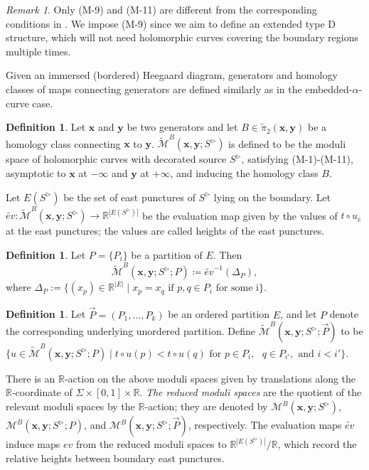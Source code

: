\documentclass{amsart}
\theoremstyle{definition}
\newtheorem{defn}[thm]{Definition}
\theoremstyle{remark}
\newtheorem{rmk}[thm]{Remark}
\numberwithin{equation}{section}
\numberwithin{equation}{section} \makeatletter
\begin{document}
\begin{rmk}
Only (M-9) and (M-11) are different from the corresponding conditions in \cite{LOT18}. We impose (M-9) since we aim to define an extended type D structure, which will not need holomorphic curves covering the boundary regions multiple times.
\end{rmk}

Given an immersed (bordered) Heegaard diagram, generators and homology classes of maps connecting generators are defined similarly as in the embedded-$\alpha$-curve case.
 
\begin{defn}\label{Definition, holomorphic curve in Sigma*[0,1]* R}
Let $\bm{x}$ and $\bm{y}$ be two generators and let $B\in\tilde{\pi}_2(\bm{x},\bm{y})$ be a homology class connecting  $\bm{x}$ to $\bm{y}$. $\widetilde{\mathcal{M}}^B(\bm{x},\bm{y};S^{\triangleright})$ is defined to be the moduli space of holomorphic curves with decorated source $S^{\triangleright}$, satisfying (M-1)-(M-11), asymptotic to $\bm{x}$ at $-\infty$ and $\bm{y}$ at $+\infty$, and inducing the homology class $B$. 
\end{defn}

Let $E(S^\triangleright)$ be the set of east punctures of $S^\triangleright$ lying on the boundary. Let $\widetilde{ev}\colon \widetilde{\mathcal{M}}^B(\bm{x},\bm{y};S^{\triangleright})\rightarrow \mathbb{R}^{|E(S^\triangleright)|}$ be the evaluation map given by the values of $t\circ u_{\bar{e}}$ at the east punctures; the values are called heights of the east punctures.

\begin{defn}
Let $P=\{P_i\}$ be a partition of $E$. Then $$\widetilde{\mathcal{M}}^B(\bm{x},\bm{y};S^{\triangleright};P)\coloneqq \widetilde{ev}^{-1}(\Delta_{P}),$$ where $\Delta_P:=\{(x_p)\in \mathbb R^{|E|}\mid x_p=x_q\text{ if }p,q\in P_i \text{ for some i} \}$.
\end{defn}

\begin{defn} 
Let $\overrightarrow{P}=(P_1,\ldots,P_k)$ be an ordered partition $E$, and let $P$ denote the corresponding underlying unordered partition. Define $\widetilde{\mathcal{M}}^B(\bm{x},\bm{y};S^{\triangleright};\overrightarrow{P})$ to be $\{u\in\widetilde{\mathcal{M}}^B(\bm{x},\bm{y};S^{\triangleright};P)\mid t\circ u (p)< t\circ u(q) \text{ for }p\in P_i, \text{ } q\in P_{i'},\text{ and }i< i'\}.$
\end{defn}

There is an $\mathbb{R}$-action on the above moduli spaces given by translations along the $\mathbb{R}$-coordinate of $\Sigma\times[0,1]\times \mathbb{R}$. \textit{The reduced moduli spaces} are the  quotient of the relevant moduli spaces by the $\mathbb{R}$-action; they are denoted by $\mathcal{M}^B(\bm{x},\bm{y};S^{\triangleright})$, $\mathcal{M}^B(\bm{x},\bm{y};S^{\triangleright};{P})$, and $\mathcal{M}^B(\bm{x},\bm{y};S^{\triangleright};\overrightarrow{P})$, respectively. The evaluation maps $\widetilde{ev}$ induce maps $ev$ from the reduced moduli spaces to $\mathbb{R}^{|E(S^\triangleright)|}/\mathbb{R}$, which record the relative heights between boundary east punctures.\\
\end{document}
